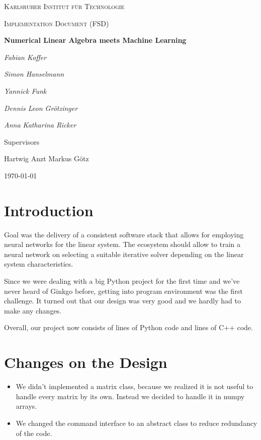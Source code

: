 \documentclass[parskip=full]{scrartcl}
\begin{document}
\begin{titlepage}
\centering
{\scshape\LARGE Karlsruher Institut für Technologie\par}
\vspace{1cm}
{\scshape\Large Implementation Document (FSD)\par}
\vspace{1.5cm}
{\huge\bfseries Numerical Linear Algebra meets Machine Learning \par}
\vspace {2cm}

{\Large\itshape Fabian Koffer\par}
{\Large\itshape Simon Hanselmann\par}
{\Large\itshape Yannick Funk\par}
{\Large\itshape Dennis Leon Gr\"{o}tzinger\par}
{\Large\itshape Anna Katharina Ricker\par}

\vfill
Supervisors\par
Hartwig Anzt
Markus G\"{o}tz

\vfill
{\large\today\par}
\end{titlepage}

\tableofcontents
\newpage


\section{Introduction}
Goal was the delivery of a consistent software stack that allows for employing \glspl{neural network} for the linear system. 
The ecosystem should allow to train a \gls{neural network} on selecting a suitable \gls{iterative solver} depending on the linear system characteristics.

Since we were dealing with a big Python project for the first time and we've never heard of Ginkgo before, getting into program environment was the first challenge.
It turned out that our design was very good and we hardly had to make any changes.

Overall, our project now consists of lines of Python code and lines of C++ code.

\section{Changes on the Design}
\begin{itemize}
\item We didn't implemented a matrix class, because we realized it is not useful to handle every matrix by its own. 
Instead we decided to handle it in numpy arrays.
\item We changed the command interface to an abstract class to reduce redundancy of the code.
\end{itemize}
\end{document}
